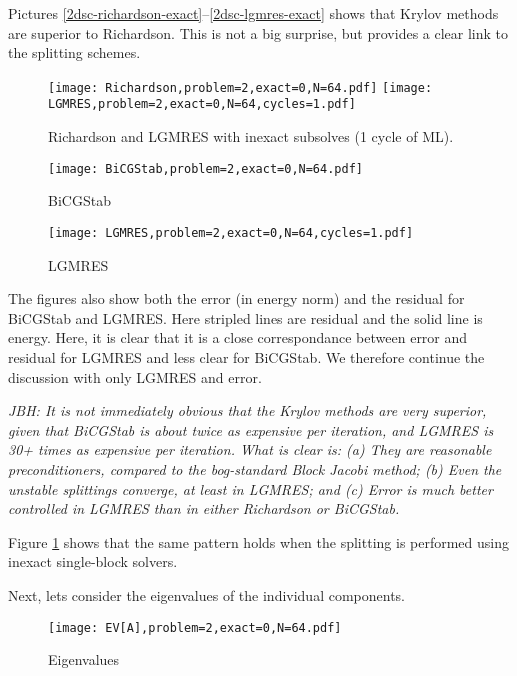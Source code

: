 \documentclass{article}
\begin{document}
Pictures \ref{2dsc-richardson-exact}--\ref{2dsc-lgmres-exact} shows that Krylov methods are superior to Richardson. This is not a big surprise, but provides
a clear link to the splitting schemes.

\begin{figure}
\begin{center}
\texttt{[image: Richardson,problem=2,exact=0,N=64.pdf]}
\texttt{[image: LGMRES,problem=2,exact=0,N=64,cycles=1.pdf]}
\caption{Richardson and LGMRES with inexact subsolves (1 cycle of ML).} 
\label{2dsc-richardson-lgmres-inexact}
\end{center}
\end{figure}

\begin{figure}
\begin{center}
\texttt{[image: BiCGStab,problem=2,exact=0,N=64.pdf]}
\caption{BiCGStab} 
\end{center}
\end{figure}

\begin{figure}
\begin{center}
\texttt{[image: LGMRES,problem=2,exact=0,N=64,cycles=1.pdf]}
\caption{LGMRES} 
\end{center}
\end{figure}

The figures also show both the error (in energy norm) and the residual for BiCGStab and LGMRES. 
Here stripled lines are residual and the solid line is energy. Here, it is clear that it is a
close correspondance between error and residual for LGMRES and less clear for BiCGStab. We therefore
continue the discussion with only LGMRES and error.


\emph{JBH: It is not immediately obvious that the Krylov methods are very
  superior, given that BiCGStab is about twice as expensive per iteration, and
  LGMRES is 30+ times as expensive per iteration. What is clear is: (a) They
  are reasonable preconditioners, compared to the bog-standard Block Jacobi
  method; (b) Even the unstable splittings converge, at least in LGMRES; and
  (c) Error is much better controlled in LGMRES than in either Richardson or
  BiCGStab.}

Figure \ref{2dsc-richardson-lgmres-inexact} shows that the same pattern holds
when the splitting is performed using inexact single-block solvers.

Next, lets consider the eigenvalues of the individual components. 
\begin{figure}
\begin{center}
\texttt{[image: EV[A],problem=2,exact=0,N=64.pdf]}
\caption{Eigenvalues} 
\end{center}
\end{figure}
\end{document}
